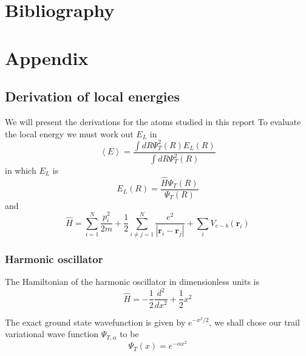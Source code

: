 \documentclass{article}
\begin{document}

\section{Bibliography}

{}





\section{Appendix}
\subsection{Derivation of local energies}
We will present the derivations for the atoms studied in this report
To evaluate the local energy we must work out $E_L$ in 
\begin{equation}
 \left\langle E \right\rangle = \frac{\int dR \Psi_T^2(R)E_L(R)}{\int dR \Psi_T^2(R)}
\end{equation}
in which $E_L$ is
\begin{equation}
 E_L(R)=\frac{\hat{H}\Psi_T(R)}{\Psi_T(R)}
\end{equation}
and
\begin{equation}
 \hat{H}=\sum_{i=1}^N \frac{p_i^2}{2m}+\frac12 \sum_{i\ne j=1}^N \frac{e^2}{\left| \mathbf{r}_i -\mathbf{r}_j \right|}+\sum_i V_{e-b}(\mathbf{r}_i)
\end{equation}

\subsubsection{Harmonic oscillator}
The Hamiltonian of the harmonic oscillator in dimensionless units is
\begin{equation}
 \hat{H}=-\frac12 \frac{d^2}{dx^2}+\frac12 x^2
\end{equation}

The exact ground state wavefunction is given by $e^{-x^2/2}$, we shall chose our trail variational wave function $\Psi_{T,\alpha}$ to be
\begin{equation}
 \Psi_{T}(x)=e^{-\alpha x^2}
\end{equation}
\end{document}
